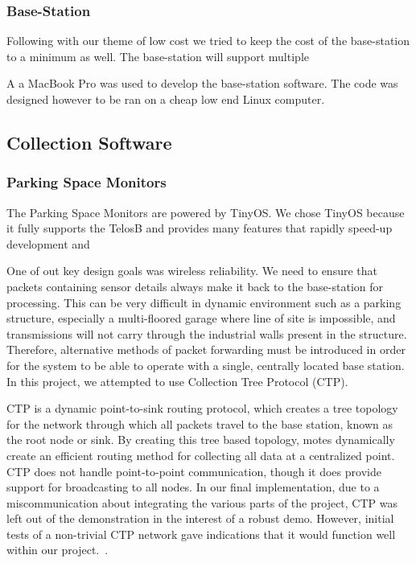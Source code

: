 \documentclass{acm_proc}
\begin{document}
\subsubsection{Base-Station}
Following with our theme of low cost we tried to keep the cost of the base-station to a minimum as well.  The base-station will support multiple 

A a MacBook Pro was used to develop the base-station software.  The code was designed however to be ran on a cheap low end Linux computer.  

\subsection{Collection Software}

\subsubsection{Parking Space Monitors}

The Parking Space Monitors are powered by TinyOS.  We chose TinyOS because it fully supports the TelosB and provides many features that rapidly speed-up development and 

One of out key design goals was wireless reliability. We need to ensure that packets containing sensor details always make it back to the base-station for processing.  This can be very difficult in dynamic environment such as a parking structure, especially a multi-floored garage where line of site is impossible, and transmissions will not carry through the industrial walls present in the structure.  Therefore, alternative methods of packet forwarding must be introduced in order for the system to be able to operate with a single, centrally located base station.  In this project, we attempted to use Collection Tree Protocol (CTP).

CTP is a dynamic point-to-sink routing protocol, which creates a tree topology for the network through which all packets travel to the base station, known as the root node or sink.  By creating this tree based topology, motes dynamically create an efficient routing method for collecting all data at a centralized point.  CTP does not handle point-to-point communication, though it does provide support for broadcasting to all nodes.  In our final implementation, due to a miscommunication about integrating the various parts of the project, CTP was left out of the demonstration in the interest of a robust demo.  However, initial tests of a non-trivial CTP network gave indications that it would function well within our project.~\cite{tep123:collection-tree-protocol}.
\end{document}
